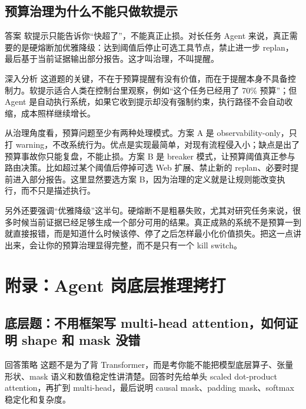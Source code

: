 \documentclass[12pt]{article}
\begin{document}
\subsection{预算治理为什么不能只做软提示}
\begin{qaBox}{答案}
软提示只能告诉你“快超了”，不能真正止损。对长任务 Agent 来说，真正需要的是硬熔断加优雅降级：达到阈值后停止可选工具节点，禁止进一步 replan，最后基于当前证据输出部分报告。这才叫治理，不叫提醒。
\end{qaBox}

\begin{analysisBox}{深入分析}
这道题的关键，不在于预算提醒有没有价值，而在于提醒本身不具备控制力。软提示适合人类在控制台里观察，例如“这个任务已经用了 70\% 预算”；但 Agent 是自动执行系统，如果它收到提示却没有强制约束，执行路径不会自动收缩，成本照样继续增长。

从治理角度看，预算问题至少有两种处理模式。方案 A 是 observability-only，只打 warning，不改系统行为。优点是实现最简单，对现有流程侵入小；缺点是出了预算事故你只能复盘，不能止损。方案 B 是 breaker 模式，让预算阈值真正参与路由决策。比如超过某个阈值后停掉可选 Web 扩展、禁止新的 replan、必要时提前进入部分报告。这里显然要选方案 B，因为治理的定义就是让规则能改变执行，而不只是描述执行。

另外还要强调“优雅降级”这半句。硬熔断不是粗暴失败，尤其对研究任务来说，很多时候当前证据已经足够生成一个部分可用的结果。真正成熟的系统不是预算一到就直接报错，而是知道什么时候该停、停了之后怎样最小化价值损失。把这一点讲出来，会让你的预算治理显得完整，而不是只有一个 kill switch。
\end{analysisBox}

\section{附录：Agent 岗底层推理拷打}

\subsection{底层题：不用框架写 multi-head attention，如何证明 shape 和 mask 没错}
\begin{qaBox}{回答策略}
这题不是为了背 Transformer，而是考你能不能把模型底层算子、张量形状、mask 语义和数值稳定性讲清楚。回答时先给单头 scaled dot-product attention，再扩到 multi-head，最后说明 causal mask、padding mask、softmax 稳定化和复杂度。
\end{qaBox}
\end{document}
